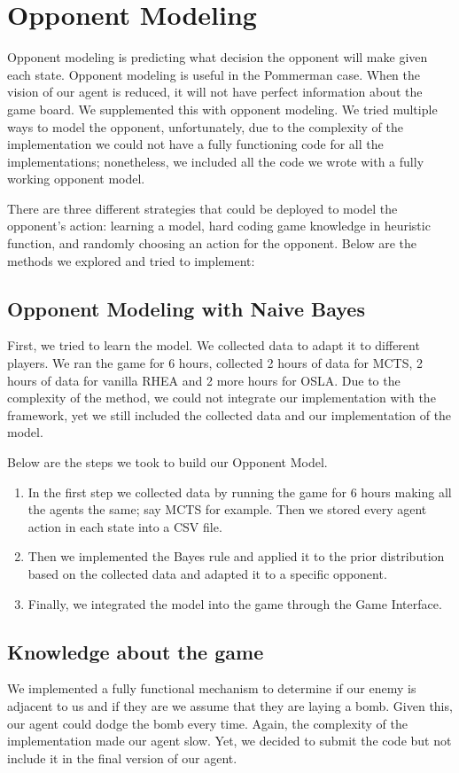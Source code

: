 \documentclass{report}
\begin{document}
	\section{Opponent Modeling}
	Opponent modeling is predicting what decision the opponent will make given each state.
	Opponent modeling is useful in the Pommerman case. When the vision of our agent is reduced, it will not have perfect information about the game board. We supplemented this with opponent modeling. We tried multiple ways to model the opponent, unfortunately, due to the complexity of the implementation we could not have a fully functioning code for all the implementations; nonetheless, we included all the code we wrote with a fully working opponent model.



	There are three different strategies that could be deployed to model the opponent's action: learning a model, hard coding game knowledge in heuristic function, and randomly choosing an action for the opponent. Below are the methods we explored and tried to implement:

	\subsection {Opponent Modeling with Naive Bayes}
	First, we tried to learn the model. We collected data to adapt it to different players. We ran the game for 6 hours, collected 2 hours of data for MCTS, 2 hours of data for vanilla RHEA and 2 more hours for OSLA. Due to the complexity of the method, we could not integrate our implementation with the framework, yet we still included the collected data and our implementation of the model.

	Below are the steps we took to build our Opponent Model.
	
	\begin{enumerate}
	 \item In the first step we collected data by running the game for 6 hours making all the agents the same; say MCTS for example. Then we stored every agent action in each state into a CSV file.
	 \item Then we implemented the Bayes rule and applied it to the prior distribution based on the collected data and adapted it to a specific opponent.
	 \item Finally, we integrated the model into the game through the Game Interface.
	\end{enumerate}


	\subsection{Knowledge about the game}
	We implemented a fully functional mechanism to determine if our enemy is adjacent to us and if they are we assume that they are laying a bomb. Given this, our agent could dodge the bomb every time. Again, the complexity of the implementation made our agent slow. Yet, we decided to submit the code but not include it in the final version of our agent.
\end{document}
